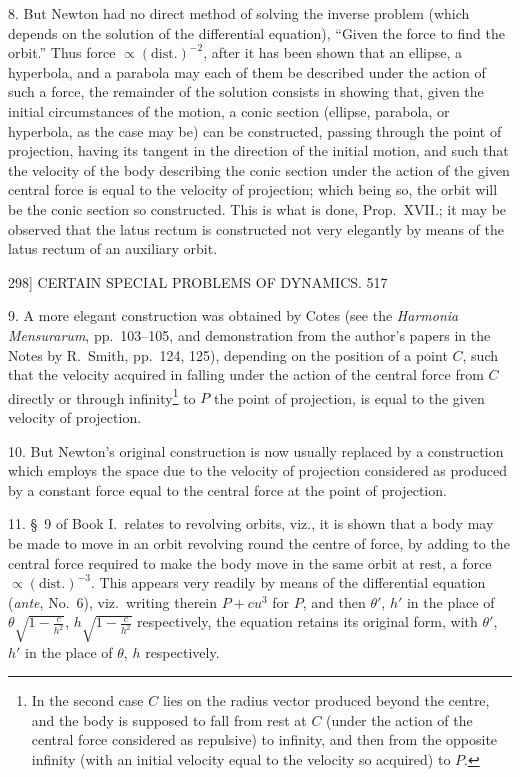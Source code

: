 \documentclass[11pt]{article}
\begin{document}
8. But Newton had no direct method of solving the inverse problem (which depends on the solution of the differential equation), ``Given the force to find the orbit.'' Thus force $\propto(\text{dist.})^{-2}$, after it has been shown that an ellipse, a hyperbola, and a parabola may each of them be described under the action of such a force, the remainder of the solution consists in showing that, given the initial circumstances of the motion, a conic section (ellipse, parabola, or hyperbola, as the case may be) can be constructed, passing through the point of projection, having its tangent in the direction of the initial motion, and such that the velocity of the body describing the conic section under the action of the given central force is equal to the velocity of projection; which being so, the orbit will be the conic section so constructed. This is what is done, Prop.\ XVII.; it may be observed that the latus rectum is constructed not very elegantly by means of the latus rectum of an auxiliary orbit.

\newpage
\begin{center}
298] \hfill CERTAIN SPECIAL PROBLEMS OF DYNAMICS. \hfill 517
\end{center}

9. A more elegant construction was obtained by Cotes (see the \emph{Harmonia Mensurarum}, pp.\ 103--105, and demonstration from the author's papers in the Notes by R.\ Smith, pp.\ 124, 125), depending on the position of a point $C$, such that the velocity acquired in falling under the action of the central force from $C$ directly or through infinity\footnote{In the second case $C$ lies on the radius vector produced beyond the centre, and the body is supposed to fall from rest at $C$ (under the action of the central force considered as repulsive) to infinity, and then from the opposite infinity (with an initial velocity equal to the velocity so acquired) to $P$.} to $P$ the point of projection, is equal to the given velocity of projection.

10. But Newton's original construction is now usually replaced by a construction which employs the space due to the velocity of projection considered as produced by a constant force equal to the central force at the point of projection.

11. \S\ 9 of Book I.\ relates to revolving orbits, viz., it is shown that a body may be made to move in an orbit revolving round the centre of force, by adding to the central force required to make the body move in the same orbit at rest, a force $\propto(\text{dist.})^{-3}$. This appears very readily by means of the differential equation (\emph{ante}, No.\ 6), viz.\ writing therein $P+cu^{3}$ for $P$, and then $\theta'$, $h'$ in the place of $\theta\sqrt{1-\frac{c}{h^{2}}}$, $h\sqrt{1-\frac{c}{h^{2}}}$ respectively, the equation retains its original form, with $\theta'$, $h'$ in the place of $\theta$, $h$ respectively.
\end{document}
